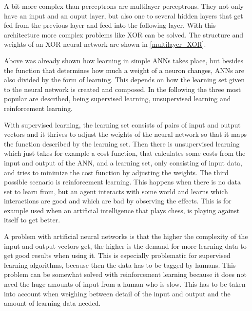 
A bit more complex than perceptrons are multilayer perceptrons. They not only have an input and an ouput layer, but also one to several hidden layers that get fed from the previous layer and feed into the following layer. With this architecture more complex problems like XOR can be solved. The structure and weights of an XOR neural network are shown in \autoref{multilayer_XOR}. \cite{introToNNs}

Above was already shown how learning in simple ANNs takes place, but besides the function that determines how much a weight of a neuron changes, ANNs are also divided by the form of learning. This depends on how the learning set given to the neural network is created and composed. In the following the three most popular are described, being supervised learning, unsupervised learning and reinforcement learning. \cite{introToNNs}

With supervised learning, the learning set consists of pairs of input and output vectors and it thrives to adjust the weights of the neural network so that it maps the function described by the learning set. Then there is unsupervised learning which just takes for example a cost function, that calculates some costs from the input and output of the ANN, and a learning set, only consisting of input data, and tries to minimize the cost function by adjusting the weights. The third possible scenario is reinforcement learning. This happens when there is no data set to learn from, but an agent interacts with some world and learns which interactions are good and which are bad by observing the effects. This is for example used when an artificial intelligence that plays chess, is playing against itself to get better. \cite{introToNNs}

A problem with artificial neural networks is that the higher the complexity of the input and output vectors get, the higher is the demand for more learning data to get good results when using it. This is especially problematic for supervised learning algorithms, because then the data has to be tagged by humans. This problem can be somewhat solved with reinforcement learning because it does not need the huge amounts of input from a human who is slow. This has to be taken into account when weighing between detail of the input and output and the amount of learning data needed.